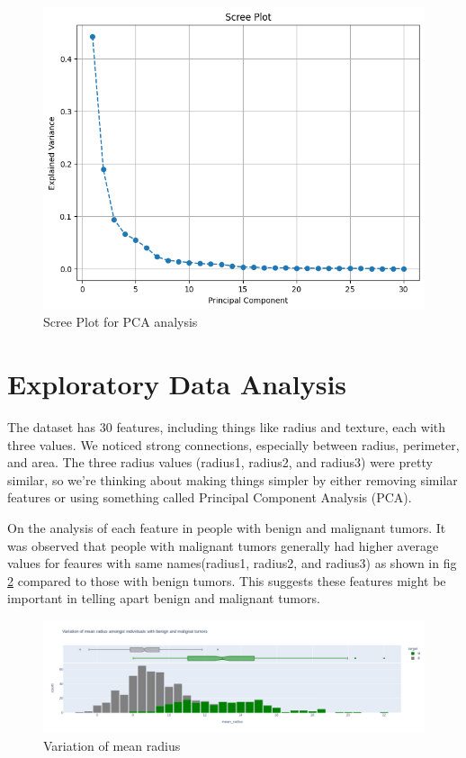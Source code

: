 \documentclass{article}
\begin{document}
\begin{figure}[H]
    \centering
    \includegraphics[width = 0.6\linewidth]{Images/scree.png}
    \caption{Scree Plot for PCA analysis}
    \label{fig:scree}
\end{figure}

\section{Exploratory Data Analysis}

The dataset has 30 features, including things like radius and texture, each with three values. We noticed strong connections, especially between radius, perimeter, and area. The three radius values (radius1, radius2, and radius3) were pretty similar, so we're thinking about making things simpler by either removing similar features or using something called Principal Component Analysis (PCA).

On the analysis of each feature in people with benign and malignant tumors. It was observed that people with malignant tumors generally had higher average values for feaures with same names(radius1, radius2, and radius3) as shown in fig \ref{fig:mean-radius} compared to those with benign tumors. This suggests these features might be important in telling apart benign and malignant tumors.

\begin{figure}[H]
    \centering
    \includegraphics[width = 0.9\linewidth]{Images/mean_radius.png}
    \caption{Variation of mean radius}
    \label{fig:mean-radius}
\end{figure}
\end{document}
